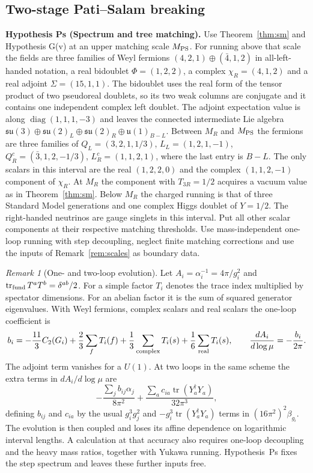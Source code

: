 \documentclass[aps,pra,onecolumn,superscriptaddress,nofootinbib,10pt]{revtex4-2}
\theoremstyle{definition}
\theoremstyle{remark}
\newtheorem{remark}[theorem]{Remark}
\begin{document}
\subsection{Two-stage Pati--Salam breaking}\label{sec:unification}

\smallskip\noindent\textbf{Hypothesis Ps (Spectrum and tree matching).}\label{hyp:Ps}  Use Theorem~\ref{thm:sm} and Hypothesis G(v) at an upper matching scale
$M_{\rm PS}$. For running above that scale the fields are three families of
Weyl fermions $(4,2,1)\oplus(\bar4,1,2)$ in all-left-handed notation,
a real bidoublet $\Phi=(1,2,2)$, a complex $\chi_R=(4,1,2)$ and
a real adjoint $\Sigma=(15,1,1)$. The bidoublet uses the real form of
the tensor product of two pseudoreal doublets, so its two weak columns
are conjugate and it contains one independent complex left doublet.
The adjoint expectation value is along
$\operatorname{diag}(1,1,1,-3)$ and leaves the connected intermediate Lie algebra
$\mathfrak{su}(3)\oplus\mathfrak{su}(2)_L\oplus\mathfrak{su}(2)_R
\oplus\mathfrak u(1)_{B-L}$. Between $M_R$ and $M_{\rm PS}$ the fermions
are three families of $Q_L=(3,2,1,1/3)$, $L_L=(1,2,1,-1)$,
$Q_R^c=(\bar3,1,2,-1/3)$, $L_R^c=(1,1,2,1)$, where the last entry is
$B-L$. The only scalars in this interval are the real $(1,2,2,0)$
and the complex $(1,1,2,-1)$ component of $\chi_R$. At $M_R$ the
component with $T_{3R}=1/2$ acquires a vacuum value as in Theorem~\ref{thm:sm}.
Below $M_R$ the charged running is that of three Standard Model generations
and one complex Higgs doublet of $Y=1/2$. The right-handed neutrinos are
gauge singlets in this interval. Put all other scalar components at their
respective matching thresholds. Use mass-independent one-loop running with
step decoupling, neglect finite matching corrections and use the inputs
of Remark~\ref{rem:scales} as boundary data.


\begin{remark}[One- and two-loop evolution]\label{ub:beta}
Let $A_i=\alpha_i^{-1}=4\pi/g_i^2$ and
$\operatorname{tr}_{\rm fund}T^aT^b=\delta^{ab}/2$.
For a simple factor $T_i$ denotes the trace index multiplied by spectator
dimensions. For an abelian factor it is the sum of squared generator
eigenvalues. With Weyl fermions, complex scalars and real scalars the
one-loop coefficient is
\[
 b_i=-\frac{11}{3}C_2(G_i)+\frac23\sum_f T_i(f)
                  +\frac13\sum_{\rm complex}T_i(s)+\frac16\sum_{\rm real}T_i(s),
 \qquad \frac{dA_i}{d\log\mu}=-\frac{b_i}{2\pi}.
\]
The adjoint term vanishes for a $U(1)$. At two loops in the same
scheme the extra terms in $dA_i/d\log\mu$ are
\[
 -\frac{\sum_j b_{ij}\alpha_j}{8\pi^2}
 +\frac{\sum_a c_{ia}\operatorname{tr}(Y_a^\dagger Y_a)}{32\pi^3},
\]
defining $b_{ij}$ and $c_{ia}$ by the usual $g_i^3 g_j^2$ and
$-g_i^3\operatorname{tr}(Y_a^\dagger Y_a)$ terms in $(16\pi^2)^2\beta_{g_i}$.
The evolution is then coupled and loses its affine dependence on
logarithmic interval lengths. A calculation at that accuracy also requires
one-loop decoupling and the heavy mass ratios, together with Yukawa running.
Hypothesis~Ps fixes the step spectrum and leaves these further
inputs free. \cite{ub:mv83,ub:mv84,ub:lx}
\end{remark}
\end{document}

